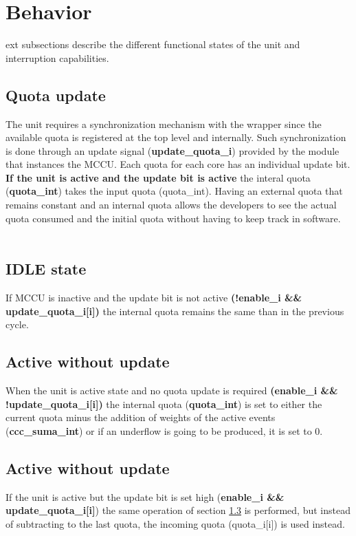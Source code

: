 \section{Behavior}\label{behavior}
ext subsections describe the different functional states of the unit and interruption capabilities.
\subsection{Quota update}
The unit requires a synchronization mechanism with the wrapper since the available quota is registered at the top level and internally. Such synchronization is done through an update signal (\textbf{update\_quota\_i}) provided by the module that instances the MCCU. Each quota for each core has an individual update bit. \textbf{If the unit is active and the update bit is active}  the interal quota (\textbf{quota\_int}) takes the input quota (quota\_int). Having an external quota that remains constant and an internal quota allows the developers to see the actual quota consumed and the initial quota without having to keep track in software.\\
\\
\subsection{IDLE state}
If MCCU is inactive and the update bit is not active \textbf{(!enable\_i \&\& update\_quota\_i[i])} the internal quota remains the same than in the previous cycle.

\subsection{Active without update}\label{awou}
When the unit is active state and no quota update is required \textbf{(enable\_i \&\& !update\_quota\_i[i])} the internal quota (\textbf{quota\_int}) is set to either the current quota minus the addition of weights of the active events (\textbf{ccc\_suma\_int}) or if an underflow is going to be produced, it is set to 0.

\subsection{Active without update}
If the unit is active but the update bit is set high (\textbf{enable\_i \&\& update\_quota\_i[i]}) the same operation of section \ref{awou} is performed, but instead of subtracting to the last quota, the incoming quota (quota\_i[i]) is used instead.
 
